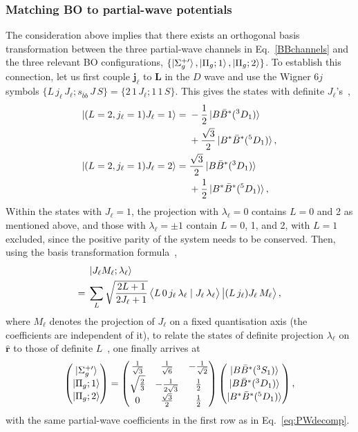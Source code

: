 \documentclass[aps,prd,showpacs,amsmath,twocolumn,superscriptaddress,floatfix,nofootinbib,notitlepage]{revtex4-2}
\newcommand{\ver}{{\bm r}}
\newcommand{\be}{\begin{equation}}
\newcommand{\ee}{\end{equation}}
\begin{document}
\subsubsection{Matching BO to partial-wave potentials}
\label{sec:BOWPmatch}

The consideration above implies that there exists an orthogonal basis transformation between the three partial-wave channels in Eq.~\eqref{BBchannels} and the three relevant BO configurations, $\{\ket{\Sigma_g^{+\prime}},\ket{\Pi_g;1},\ket{\Pi_g;2}\}$. To establish this connection, let us first couple $\bm{j}_\ell$ to $\bm{L}$ in the $D$ wave and use the Wigner $6j$ symbols $ \{L\,j_\ell\,J_\ell;s_{\bar{b} b}\,J\,S\} = \{2\,1\,J_\ell;1\,1\,S\}$. This gives the states with definite $J_\ell$'s~\cite{Brambilla:2026zfw},
\be
\begin{split}
\ket{(L=2,j_\ell=1)J_\ell=1}={}&-\frac12\ket{B\bar{B}^*(^3D_1)}\\
&+\frac{\sqrt3}{2}\ket{B^*\bar{B}^*(^5D_1)},\\
\ket{(L=2,j_\ell=1)J_\ell=2}={}&\frac{\sqrt3}{2}\ket{B\bar{B}^*(^3D_1)}\\
&+\frac12\ket{B^*\bar{B}^*(^5D_1)},
\end{split}
\label{eq:l12}
\ee
Within the states with $J_\ell=1$, the projection with $\lambda_\ell=0$ contains $L=0$ and 2 as mentioned above, and those with $\lambda_\ell=\pm1$ contain $L=0$, 1, and 2, with $L=1$ excluded, since the positive parity of the system
needs to be conserved. Then, using the basis transformation formula~\cite{Jacob:1959at},
\begin{align}
&\left|J_{\ell} M_\ell; \lambda_{\ell}\right\rangle \notag\\
={}&\sum_L \sqrt{\frac{2 L+1}{2 J_{\ell}+1}}\left\langle L\, 0\, j_{\ell}\, \lambda_{\ell} \mid J_{\ell}\, \lambda_{\ell}\right\rangle\left|(L\,j_\ell) J_{\ell}\, M_\ell\right\rangle,
\end{align}
where $M_\ell$ denotes the projection of $J_\ell$ on a fixed quantisation axis (the coefficients are independent of it),
to relate the states of definite projection $\lambda_\ell$ on $\hat{\ver}$ to those of definite $L$~\cite{Berwein:2024ztx}, one finally arrives at
\be
\begin{pmatrix}\ket{\Sigma_g^{+\prime}}\\[0.5mm] \ket{\Pi_g;1}\\[0.5mm] \ket{\Pi_g;2}\end{pmatrix}
=\begin{pmatrix}
\frac{1}{\sqrt3} & \frac{1}{\sqrt6} & -\frac{1}{\sqrt2}\\[1mm]
\sqrt{\frac23} & -\frac{1}{2\sqrt3} & \frac12\\[1mm]
0 & \frac{\sqrt3}{2} & \frac12
\end{pmatrix}
\begin{pmatrix}\ket{B\bar{B}^*(^3S_1)}\\[0.5mm] \ket{B\bar{B}^*(^3D_1)}\\[0.5mm] \ket{B^*\bar{B}^*(^5D_1)}\end{pmatrix},
\label{eq:BOchannels}
\ee
with the same partial-wave coefficients in the first row as in Eq.~\eqref{eq:PWdecomp}. 
\end{document}
